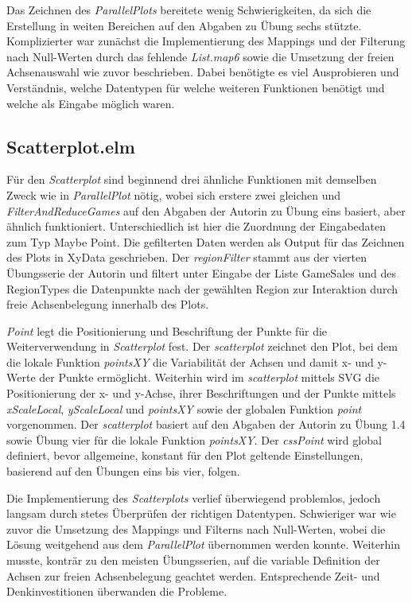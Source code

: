 \documentclass[usegeometry=true]{scrartcl}
\begin{document}
Das Zeichnen des \textit{ParallelPlots} bereitete wenig Schwierigkeiten, da sich die Erstellung in weiten Bereichen auf den Abgaben zu Übung sechs stützte.
Komplizierter war zunächst die Implementierung des Mappings und der Filterung nach Null-Werten durch das fehlende \textit{List.map6} 
sowie die Umsetzung der freien Achsenauswahl wie zuvor beschrieben. 
Dabei benötigte es viel Ausprobieren und Verständnis, welche Datentypen für welche weiteren Funktionen benötigt 
und welche als Eingabe möglich waren.

\subsection{Scatterplot.elm}
Für den \textit{Scatterplot} sind beginnend drei ähnliche Funktionen mit demselben Zweck wie in \textit{ParallelPlot} nötig,
wobei sich erstere zwei gleichen und \textit{FilterAndReduceGames} auf den Abgaben der Autorin zu Übung eins basiert, aber ähnlich funktioniert.
Unterschiedlich ist hier die Zuordnung der Eingabedaten zum Typ Maybe Point.
Die gefilterten Daten werden als Output für das Zeichnen des Plots in XyData geschrieben.
Der \textit{regionFilter} stammt aus der vierten Übungsserie der Autorin und filtert unter Eingabe der Liste GameSales und des RegionTypes 
die Datenpunkte nach der gewählten Region zur Interaktion durch freie Achsenbelegung innerhalb des Plots.

\textit{Point} legt die Positionierung und Beschriftung der Punkte für die Weiterverwendung in \textit{Scatterplot} fest.
Der \textit{scatterplot} zeichnet den Plot, bei dem die lokale Funktion \textit{pointsXY} die Variabilität der Achsen und damit x- und y-Werte der Punkte ermöglicht.
Weiterhin wird im \textit{scatterplot} mittels SVG die Positionierung der x- und y-Achse, ihrer Beschriftungen 
und der Punkte mittels \textit{xScaleLocal}, \textit{yScaleLocal} und \textit{pointsXY} sowie der globalen Funktion \textit{point} vorgenommen. 
Der \textit{scatterplot} basiert auf den Abgaben der Autorin zu Übung 1.4 sowie Übung vier für die lokale Funktion \textit{pointsXY}. 
Der \textit{cssPoint} wird global definiert, bevor allgemeine, konstant für den Plot geltende Einstellungen, 
basierend auf den Übungen eins bis vier, folgen. 

Die Implementierung des \textit{Scatterplots} verlief überwiegend problemlos, jedoch langsam durch stetes Überprüfen der richtigen Datentypen.
Schwieriger war wie zuvor die Umsetzung des Mappings und Filterns nach Null-Werten, wobei die Lösung weitgehend aus dem \textit{ParallelPlot} übernommen werden konnte. 
Weiterhin musste, konträr zu den meisten Übungsserien, auf die variable Definition der Achsen zur freien Achsenbelegung geachtet werden.
Entsprechende Zeit- und Denkinvestitionen überwanden die Probleme.
\end{document}
